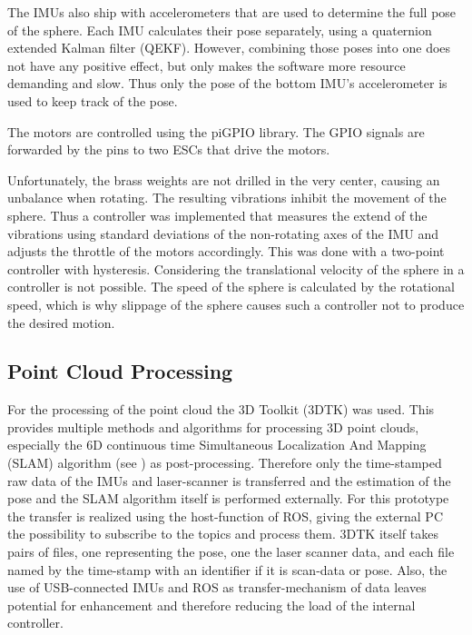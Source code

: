 The IMUs also ship with accelerometers that are used to determine the full pose of the sphere.
Each IMU calculates their pose separately, using a quaternion extended Kalman filter (QEKF).
However, combining those poses into one does not have any positive effect, but only makes the software more resource demanding and slow.
Thus only the pose of the bottom IMU's accelerometer is used to keep track of the pose.

The motors are controlled using the piGPIO library. The GPIO signals are forwarded by the pins to two ESCs that drive the motors. 

Unfortunately, the brass weights are not drilled in the very center, causing an unbalance when rotating.
The resulting vibrations inhibit the movement of the sphere.
Thus a controller was implemented that measures the extend of the vibrations using standard deviations of the non-rotating axes of the IMU and adjusts the throttle of the motors accordingly.
This was done with a two-point controller with hysteresis.
Considering the translational velocity of the sphere in a controller is not possible.
The speed of the sphere is calculated by the rotational speed, which is why slippage of the sphere causes such a controller not to produce the desired motion. 

\subsection{Point Cloud Processing}                                                                                                                                                                                  
\label{sec:TechnicalApproach:pointcloudprocessing}
For the processing of the point cloud the 3D Toolkit (3DTK) was used.
This provides multiple methods and algorithms for processing 3D point clouds, especially the 6D continuous time Simultaneous Localization And Mapping (SLAM) algorithm (see \cite{3DARCH2017_1, LS2019}) as post-processing.
Therefore only the time-stamped raw data of the IMUs and laser-scanner is transferred and the estimation of the pose and the SLAM algorithm itself is performed externally.
For this prototype the transfer is realized using the host-function of ROS, giving the external PC the possibility to subscribe to the topics and process them.
3DTK itself takes pairs of files, one representing the pose, one the laser scanner data, and each file named by the time-stamp with an identifier if it is scan-data or pose.
Also, the use of USB-connected IMUs and ROS as transfer-mechanism of data leaves potential for enhancement and therefore reducing the load of the internal controller.
